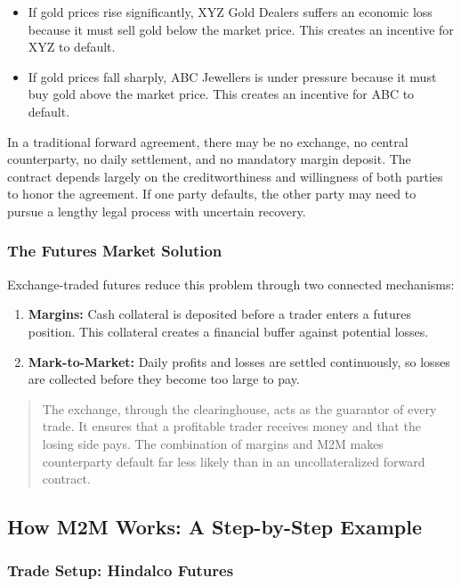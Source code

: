 \documentclass[12pt,openany]{book}
\begin{document}
\begin{itemize}[leftmargin=*]
    \item If gold prices rise significantly, XYZ Gold Dealers suffers an economic loss because it must sell gold below the market price. This creates an incentive for XYZ to default.
    \item If gold prices fall sharply, ABC Jewellers is under pressure because it must buy gold above the market price. This creates an incentive for ABC to default.
\end{itemize}

In a traditional forward agreement, there may be no exchange, no central counterparty, no daily settlement, and no mandatory margin deposit. The contract depends largely on the creditworthiness and willingness of both parties to honor the agreement. If one party defaults, the other party may need to pursue a lengthy legal process with uncertain recovery.

\subsubsection{The Futures Market Solution}
Exchange-traded futures reduce this problem through two connected mechanisms:

\begin{enumerate}[leftmargin=*]
    \item \textbf{Margins:} Cash collateral is deposited before a trader enters a futures position. This collateral creates a financial buffer against potential losses.
    \item \textbf{Mark-to-Market:} Daily profits and losses are settled continuously, so losses are collected before they become too large to pay.
\end{enumerate}

\begin{quote}
The exchange, through the clearinghouse, acts as the guarantor of every trade. It ensures that a profitable trader receives money and that the losing side pays. The combination of margins and M2M makes counterparty default far less likely than in an uncollateralized forward contract.
\end{quote}

\subsection{How M2M Works: A Step-by-Step Example}

\subsubsection{Trade Setup: Hindalco Futures}
\end{document}
